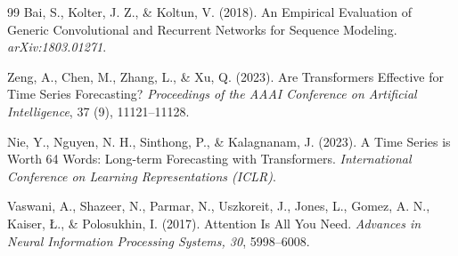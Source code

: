 \begin{thebibliography}{99}
Bai, S., Kolter, J. Z., \& Koltun, V. (2018). An Empirical Evaluation of Generic
Convolutional and Recurrent Networks for Sequence Modeling. \textit{arXiv:1803.01271}.

Zeng, A., Chen, M., Zhang, L., \& Xu, Q. (2023). Are Transformers Effective for Time Series
Forecasting? \textit{Proceedings of the AAAI Conference on Artificial Intelligence}, 37 (9),
11121--11128.

Nie, Y., Nguyen, N. H., Sinthong, P., \& Kalagnanam, J. (2023). A Time Series is Worth 64
Words: Long-term Forecasting with Transformers. \textit{International Conference on Learning
Representations (ICLR)}.

Vaswani, A., Shazeer, N., Parmar, N., Uszkoreit, J., Jones, L., Gomez, A. N., Kaiser,
\L., \& Polosukhin, I. (2017). Attention Is All You Need. \textit{Advances in Neural
Information Processing Systems, 30}, 5998--6008.

\end{thebibliography}
